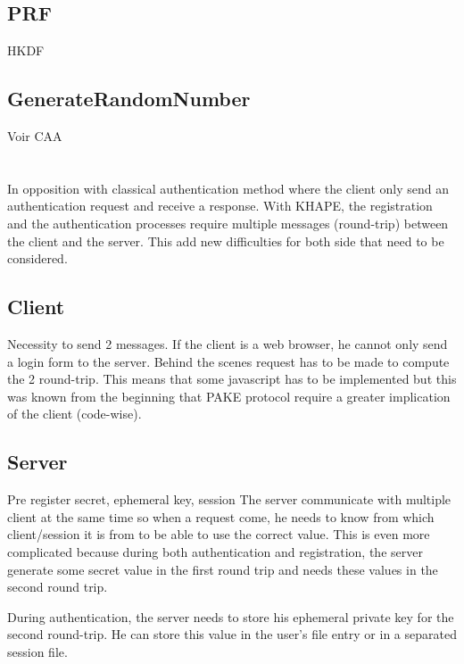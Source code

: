 \documentclass[../report.tex]{subfiles}
\begin{document}
\subsection{PRF}
HKDF



\subsection{GenerateRandomNumber}
Voir CAA





\section{}

In opposition with classical authentication method where the client only send an authentication request and receive a response. With KHAPE, the registration and the authentication processes require multiple messages (round-trip) between the client and the server.
This add new difficulties for both side that need to be considered.

\subsection{Client}
Necessity to send 2 messages. If the client is a web browser, he cannot only send a login form to the server. Behind the scenes request has to be made to compute the 2 round-trip. This means that some javascript has to be implemented but this was known from the beginning that PAKE protocol require a greater implication of the client (code-wise).

\subsection{Server}
Pre register secret, ephemeral key, session
The server communicate with multiple client at the same time so when a request come, he needs to know from which client/session it is from to be able to use the correct value. This is even more complicated because during both authentication and registration, the server generate some secret value in the first round trip and needs these values in the second round trip.



During authentication, the server needs to store his ephemeral private key for the second round-trip. He can store this value in the user's file entry or in a separated session file.
\end{document}
